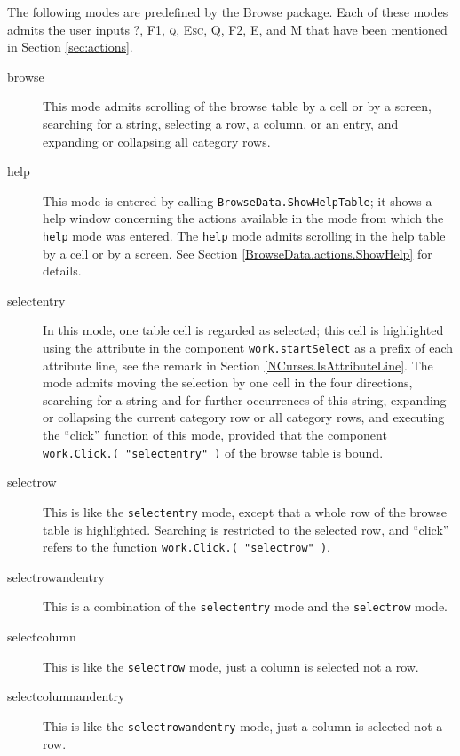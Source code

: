 \documentclass[a4paper,11pt]{report}
\begin{document}
{{ The following modes are predefined by the \textsf{Browse} package. Each of these modes admits the user inputs \textsc{?}, \textsc{F1}, \textsc{q}, \textsc{Esc}, \textsc{Q}, \textsc{F2}, \textsc{E}, and \textsc{M} that have been mentioned in Section \ref{sec:actions}. 
\begin{description}
\item[{browse}]  This mode admits scrolling of the browse table by a cell or by a screen,
searching for a string, selecting a row, a column, or an entry, and expanding
or collapsing all category rows. 
\item[{help}]  This mode is entered by calling \texttt{BrowseData.ShowHelpTable}; it shows a help window concerning the actions available in the mode from
which the \texttt{help} mode was entered. The \texttt{help} mode admits scrolling in the help table by a cell or by a screen. See Section \ref{BrowseData.actions.ShowHelp} for details. 
\item[{select{\textunderscore}entry}]  In this mode, one table cell is regarded as selected; this cell is highlighted
using the attribute in the component \texttt{work.startSelect} as a prefix of each attribute line, see the remark in Section \ref{NCurses.IsAttributeLine}. The mode admits moving the selection by one cell in the four directions,
searching for a string and for further occurrences of this string, expanding
or collapsing the current category row or all category rows, and executing the ``click'' function of this mode, provided that the component \texttt{work.Click.( "select{\textunderscore}entry" )} of the browse table is bound. 
\item[{select{\textunderscore}row}]  This is like the \texttt{select{\textunderscore}entry} mode, except that a whole row of the browse table is highlighted. Searching is
restricted to the selected row, and ``click'' refers to the function \texttt{work.Click.( "select{\textunderscore}row" )}. 
\item[{select{\textunderscore}row{\textunderscore}and{\textunderscore}entry}]  This is a combination of the \texttt{select{\textunderscore}entry} mode and the \texttt{select{\textunderscore}row} mode. 
\item[{select{\textunderscore}column}]  This is like the \texttt{select{\textunderscore}row} mode, just a column is selected not a row. 
\item[{select{\textunderscore}column{\textunderscore}and{\textunderscore}entry}]  This is like the \texttt{select{\textunderscore}row{\textunderscore}and{\textunderscore}entry} mode, just a column is selected not a row. 
\end{description}
 }

}
\end{document}
